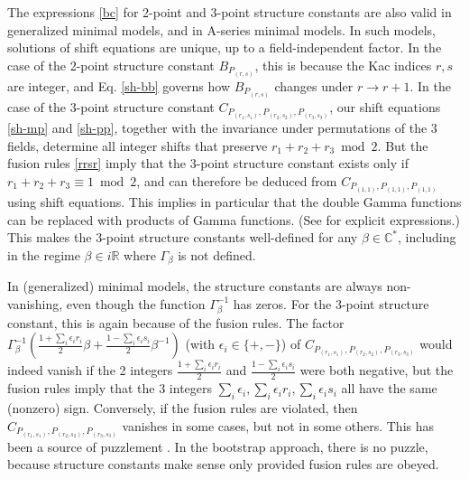 \documentclass[12pt, a4paper]{article}
\theoremstyle{break}
\begin{document}
The expressions \eqref{bc} for 2-point and 3-point structure constants are also valid in generalized minimal models, and in A-series minimal models. In such models, solutions of shift equations are unique, up to a field-independent factor. In the case of the 2-point structure constant $B_{P_{(r,s)}}$, this is because the Kac indices $r,s$ are integer, and Eq. \eqref{sh-bb} governs how $B_{P_{(r,s)}}$ changes under $r\to r+1$. In the case of the 3-point structure constant $C_{P_{(r_1,s_1)},P_{(r_2,s_2)},P_{(r_3,s_3)}}$, our shift equations \eqref{sh-mp} and \eqref{sh-pp}, together with the invariance under permutations of the 3 fields, determine all integer shifts that preserve $r_1+r_2+r_3\bmod 2$. But the fusion rules \eqref{rrsr} imply that the 3-point structure constant exists only if $r_1+r_2+r_3\equiv 1\bmod 2$, and can therefore be deduced from $C_{P_{(1,1)},P_{(1,1)},P_{(1,1)}}$ using shift equations. This implies in particular that the double Gamma functions can be replaced with products of Gamma functions. (See \cite[Section 3.2.1]{rib14} for explicit expressions.) This makes the 3-point structure constants well-defined for any $\beta\in \mathbb{C}^*$, including in the regime $\beta\in i\mathbb{R}$ where $\Gamma_\beta$ is not defined.

In (generalized) minimal models, the structure constants are always non-vanishing, even though the function $\Gamma_\beta^{-1}$ has zeros. For the 3-point structure constant, this is again because of the fusion rules. 
The factor $\Gamma_\beta^{-1}\left(\frac{1+\sum_i\epsilon_ir_i}{2}\beta + \frac{1-\sum_i \epsilon_is_i}{2}\beta^{-1}\right)$ (with $\epsilon_i\in \{+,-\}$) of $C_{P_{(r_1,s_1)},P_{(r_2,s_2)},P_{(r_3,s_3)}}$ would indeed vanish if the 2 integers $\frac{1+\sum_i\epsilon_ir_i}{2}$ and $\frac{1-\sum_i \epsilon_is_i}{2}$ were both negative, but the fusion rules imply that the 3 integers $\sum_i\epsilon_i,\sum_i\epsilon_ir_i,\sum_i\epsilon_is_i$ all have the same (nonzero) sign. Conversely, if the fusion rules are violated, then $C_{P_{(r_1,s_1)},P_{(r_2,s_2)},P_{(r_3,s_3)}}$ vanishes in some cases, but not in some others. This has been a source of puzzlement \cite{zam05}. In the bootstrap approach, there is no puzzle, because structure constants make sense only provided fusion rules are obeyed. 
\end{document}
